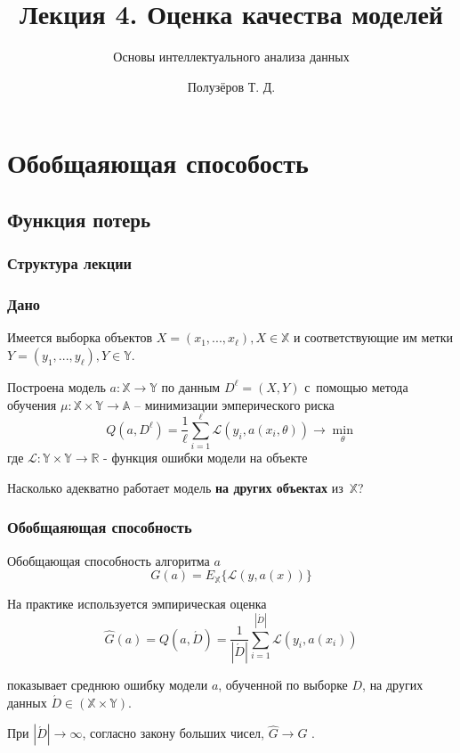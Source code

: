 \documentclass{beamer}
\title[Метрики]{Лекция 4. Оценка качества моделей}
\subtitle{Основы интеллектуального анализа данных}
\author{Полузёров Т. Д.}
\institute{БГУ ФПМИ}
\date{}
\begin{document}
	
	\begin{frame}
		\titlepage
	\end{frame}
	
	\section{Обобщаяющая способость}
	
	\subsection{Функция потерь}
	
	\begin{center}
		\frametitle{Структура лекции}
		\tableofcontents	
	\end{center}

	\begin{frame}
		\frametitle{Дано}
		Имеется выборка объектов $X = (x_1, ..., x_{\ell}), X \in \mathbb{X}$ и соответствующие им метки $Y = (y_1, ..., y_{\ell}), Y \in \mathbb{Y}$.
		
		\vspace{5pt}
		
		Построена модель $a: \mathbb{X} \rightarrow \mathbb{Y}$ по данным $D^{\ell} = (X, Y)$ с~помощью метода обучения $\mu: \mathbb{X} \times \mathbb{Y} \rightarrow \mathbb{A}$ -- минимизации эмперического риска
		\[
		Q(a, D^{\ell}) = \frac{1}{\ell} \sum_{i=1}^{\ell} \mathcal{L}(y_i, a(x_i, \theta))
		\rightarrow \min_{\theta}
		\]
		где $\mathcal{L}: \mathbb{Y} \times \mathbb{Y} \rightarrow \mathbb{R}$ - функция ошибки модели на объекте
		
		\vspace{15pt}
		
		Насколько адекватно работает модель \textbf{на других объектах} из~$\mathbb{X}$?	
	\end{frame}
	
	\begin{frame}
		\frametitle{Обобщаяющая способность}
		
		Обобщающая способность алгоритма $a$
		\[
		G(a) = E_{\mathbb{X}}\{\mathcal{L}(y, a(x))\}
		\]
		
		На практике используется эмпирическая оценка   
		\[
		\hat{G}(a) = 
		Q(a, \acute{D}) 
		= \frac{1}{|\acute{D}|} 
		\sum_{i=1}^{|\acute{D}|} 
		\mathcal{L}(y_i, a(x_i))
		\]
		
		показывает среднюю ошибку модели $a$, обученной по выборке $D$, на других данных $\acute{D} \in (\mathbb{X} \times \mathbb{Y})$.
		
		При $|\acute{D}| \rightarrow \infty$, согласно закону больших чисел, $\hat{G} \rightarrow G$ .
	\end{frame}
	
\end{document}
